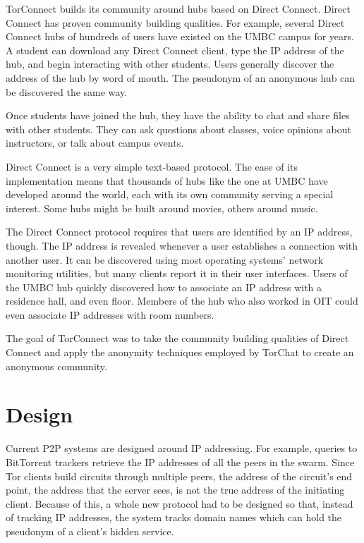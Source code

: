 \documentclass{article}
\begin{document}
TorConnect builds its community around hubs based on Direct Connect.  Direct Connect has proven community building qualities.  For example, several Direct Connect hubs of hundreds of users have existed on the UMBC campus for years.  A student can download any Direct Connect client, type the IP address of the hub, and begin interacting with other students.  Users generally discover the address of the hub by word of mouth.  The pseudonym of an anonymous hub can be discovered the same way.

Once students have joined the hub, they have the ability to chat and share files with other students.  They can ask questions about classes, voice opinions about instructors, or talk about campus events.

Direct Connect is a very simple text-based protocol.  The ease of its implementation means that thousands of hubs like the one at UMBC have developed around the world, each with its own community serving a special interest.  Some hubs might be built around movies, others around music.

The Direct Connect protocol requires that users are identified by an IP address, though.  The IP address is revealed whenever a user establishes a connection with another user.  It can be discovered using most operating systems' network monitoring utilities, but many clients report it in their user interfaces.  Users of the UMBC hub quickly discovered how to associate an IP address with a residence hall, and even floor.  Members of the hub who also worked in OIT could even associate IP addresses with room numbers.

The goal of TorConnect was to take the community building qualities of Direct Connect and apply the anonymity techniques employed by TorChat to create an anonymous community.

\section{Design}
Current P2P systems are designed around IP addressing.  For example, queries to BitTorrent trackers retrieve the IP addresses of all the peers in the swarm.  Since Tor clients build circuits through multiple peers, the address of the circuit's end point, the address that the server sees, is not the true address of the initiating client.  Because of this, a whole new protocol had to be designed so that, instead of tracking IP addresses, the system tracks domain names which can hold the pseudonym of a client's hidden service.
\end{document}
